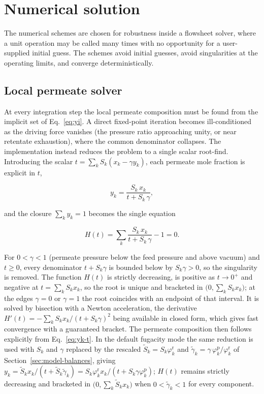 \documentclass[a4paper,fleqn]{cas-dc}
\begin{document}
\section{Numerical solution}\label{sec:numerics}
The numerical schemes are chosen for robustness inside a flowsheet solver, where
a unit operation may be called many times with no opportunity for a user-supplied
initial guess. The schemes avoid initial guesses, avoid singularities at the
operating limits, and converge deterministically.

\subsection{Local permeate solver}\label{sec:numerics-local}
At every integration step the local permeate composition must be found from the
implicit set of Eq.~\eqref{eq:yi}. A direct fixed-point iteration becomes
ill-conditioned as the driving force vanishes (the pressure ratio approaching
unity, or near retentate exhaustion), where the common denominator collapses. The implementation instead reduces the problem to a single scalar
root-find. Introducing the scalar $t = \sum_k S_k (x_k - \gamma y_k)$, each
permeate mole fraction is explicit in $t$,

\begin{equation}\label{eq:yk-t}
y_k = \frac{S_k\,x_k}{t + S_k\,\gamma},
\end{equation}

and the closure $\sum_k y_k = 1$ becomes the single equation

\begin{equation}\label{eq:Ht}
H(t) = \sum_k \frac{S_k\,x_k}{t + S_k\,\gamma} - 1 = 0.
\end{equation}

For $0 < \gamma < 1$ (permeate pressure below the feed pressure and above
vacuum) and $t \ge 0$, every denominator $t + S_k\gamma$ is bounded below by
$S_k\gamma > 0$, so the singularity is removed. The function $H(t)$ is strictly
decreasing, is positive as $t \to 0^{+}$ and negative at $t = \sum_k S_k x_k$, so
the root is unique and bracketed in $\bigl(0, \sum_k S_k x_k\bigr)$; at the edges
$\gamma = 0$ or $\gamma = 1$ the root coincides with an endpoint of that interval. It is solved
by bisection with a Newton acceleration, the derivative
$H'(t) = -\sum_k S_k x_k / (t + S_k \gamma)^2$ being available in closed form,
which gives fast convergence with a guaranteed bracket. The permeate composition
then follows explicitly from Eq.~\eqref{eq:yk-t}. In the default fugacity mode the
same reduction is used with $S_k$ and $\gamma$ replaced by the rescaled
$\tilde{S}_k = S_k\varphi_k^{\mathrm{r}}$ and
$\tilde{\gamma}_k = \gamma\,\varphi_k^{\mathrm{p}}/\varphi_k^{\mathrm{r}}$ of
Section~\ref{sec:model-balances}, giving
$y_k = \tilde{S}_k x_k/(t + \tilde{S}_k\tilde{\gamma}_k)
= S_k\varphi_k^{\mathrm{r}} x_k/(t + S_k\gamma\varphi_k^{\mathrm{p}})$;
$H(t)$ remains strictly decreasing and bracketed in
$\bigl(0, \sum_k \tilde{S}_k x_k\bigr)$ when $0 < \tilde{\gamma}_k < 1$ for every
component.
\end{document}
